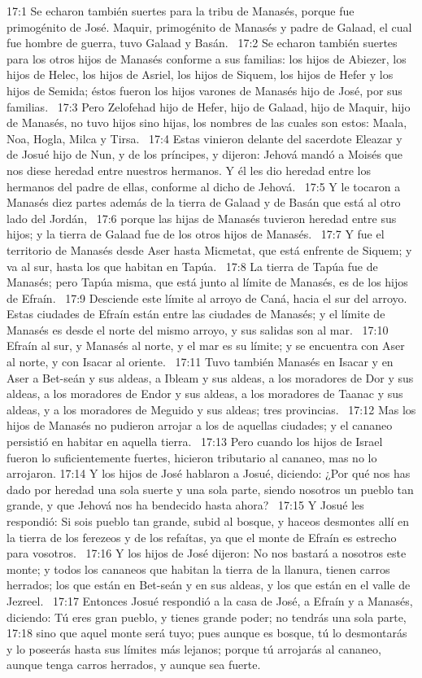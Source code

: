 17:1 Se echaron también suertes para la tribu de Manasés, porque fue primogénito de José. Maquir, primogénito de Manasés y padre de Galaad, el cual fue hombre de guerra, tuvo Galaad y Basán.  
17:2 Se echaron también suertes para los otros hijos de Manasés conforme a sus familias: los hijos de Abiezer, los hijos de Helec, los hijos de Asriel, los hijos de Siquem, los hijos de Hefer y los hijos de Semida; éstos fueron los hijos varones de Manasés hijo de José, por sus familias.  
17:3 Pero Zelofehad hijo de Hefer, hijo de Galaad, hijo de Maquir, hijo de Manasés, no tuvo hijos sino hijas, los nombres de las cuales son estos: Maala, Noa, Hogla, Milca y Tirsa.  
17:4 Estas vinieron delante del sacerdote Eleazar y de Josué hijo de Nun, y de los príncipes, y dijeron: Jehová mandó a Moisés que nos diese heredad entre nuestros hermanos. Y él les dio heredad entre los hermanos del padre de ellas, conforme al dicho de Jehová.  
17:5 Y le tocaron a Manasés diez partes además de la tierra de Galaad y de Basán que está al otro lado del Jordán,  
17:6 porque las hijas de Manasés tuvieron heredad entre sus hijos; y la tierra de Galaad fue de los otros hijos de Manasés.  
17:7 Y fue el territorio de Manasés desde Aser hasta Micmetat, que está enfrente de Siquem; y va al sur, hasta los que habitan en Tapúa.  
17:8 La tierra de Tapúa fue de Manasés; pero Tapúa misma, que está junto al límite de Manasés, es de los hijos de Efraín.  
17:9 Desciende este límite al arroyo de Caná, hacia el sur del arroyo. Estas ciudades de Efraín están entre las ciudades de Manasés; y el límite de Manasés es desde el norte del mismo arroyo, y sus salidas son al mar.  
17:10 Efraín al sur, y Manasés al norte, y el mar es su límite; y se encuentra con Aser al norte, y con Isacar al oriente.  
17:11 Tuvo también Manasés en Isacar y en Aser a Bet-seán y sus aldeas, a Ibleam y sus aldeas, a los moradores de Dor y sus aldeas, a los moradores de Endor y sus aldeas, a los moradores de Taanac y sus aldeas, y a los moradores de Meguido y sus aldeas; tres provincias.  
17:12 Mas los hijos de Manasés no pudieron arrojar a los de aquellas ciudades; y el cananeo persistió en habitar en aquella tierra.  
17:13 Pero cuando los hijos de Israel fueron lo suficientemente fuertes, hicieron tributario al cananeo, mas no lo arrojaron. 
17:14 Y los hijos de José hablaron a Josué, diciendo: ¿Por qué nos has dado por heredad una sola suerte y una sola parte, siendo nosotros un pueblo tan grande, y que Jehová nos ha bendecido hasta ahora?  
17:15 Y Josué les respondió: Si sois pueblo tan grande, subid al bosque, y haceos desmontes allí en la tierra de los ferezeos y de los refaítas, ya que el monte de Efraín es estrecho para vosotros.  
17:16 Y los hijos de José dijeron: No nos bastará a nosotros este monte; y todos los cananeos que habitan la tierra de la llanura, tienen carros herrados; los que están en Bet-seán y en sus aldeas, y los que están en el valle de Jezreel.  
17:17 Entonces Josué respondió a la casa de José, a Efraín y a Manasés, diciendo: Tú eres gran pueblo, y tienes grande poder; no tendrás una sola parte,  
17:18 sino que aquel monte será tuyo; pues aunque es bosque, tú lo desmontarás y lo poseerás hasta sus límites más lejanos; porque tú arrojarás al cananeo, aunque tenga carros herrados, y aunque sea fuerte.  
